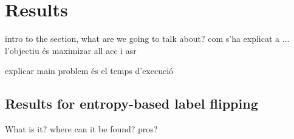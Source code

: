 \section{Results}\label{sec:results}
intro to the section, what are we going to talk about?
com s'ha explicat a ... l'objectiu és maximizar all acc i asr

explicar main problem és el temps d'execució
\subsection{Results for entropy-based label flipping}
What is it? where can it be found? pros?


\newpage
